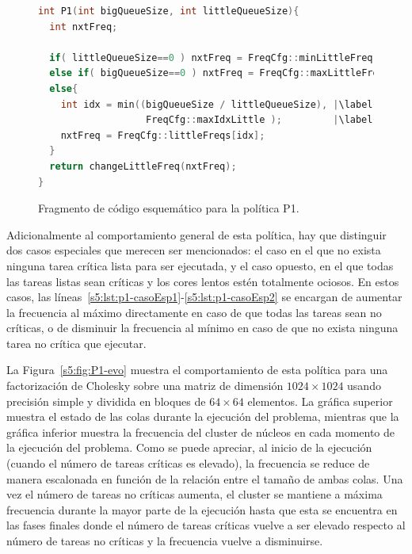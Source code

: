 \begin{figure}
  \centering

  \begin{lstlisting}[language=C++]
int P1(int bigQueueSize, int littleQueueSize){
  int nxtFreq;
      
  if( littleQueueSize==0 ) nxtFreq = FreqCfg::minLittleFreq; |\label{s5:lst:p1-casoEsp1}|
  else if( bigQueueSize==0 ) nxtFreq = FreqCfg::maxLittleFreq; |\label{s5:lst:p1-casoEsp2}|
  else{
    int idx = min((bigQueueSize / littleQueueSize), |\label{s5:lst:p1-calculoPrincipal(a)}|
                   FreqCfg::maxIdxLittle );         |\label{s5:lst:p1-calculoPrincipal(b)}|
    nxtFreq = FreqCfg::littleFreqs[idx];
  }
  return changeLittleFreq(nxtFreq);
}
\end{lstlisting}

  \caption[Fragmento de código esquemático para la política P1]
  {Fragmento de código esquemático para la política P1.}
  \label{s5:fig:listing-p1}
\end{figure}

Adicionalmente al comportamiento general de esta política, hay que
distinguir dos casos especiales que merecen ser mencionados: el caso en el
que no exista ninguna tarea crítica lista para ser ejecutada, y el caso
opuesto, en el que todas las tareas listas sean críticas y los cores lentos
estén totalmente ociosos. En estos casos, las
líneas~\ref{s5:lst:p1-casoEsp1}-\ref{s5:lst:p1-casoEsp2} se encargan de
aumentar la frecuencia al máximo directamente en caso de que todas las
tareas sean no críticas, o de disminuir la frecuencia al mínimo en caso de
que no exista ninguna tarea no crítica que ejecutar.

La Figura~\ref{s5:fig:P1-evo} muestra el comportamiento de esta política
para una factorización de Cholesky sobre una matriz de dimensión
$1024 \times 1024$ usando precisión simple y dividida en bloques de
$64 \times 64$ elementos. La gráfica superior muestra el estado de las
colas durante la ejecución del problema, mientras que la gráfica inferior
muestra la frecuencia del cluster de núcleos \LITTLE en cada momento de la
ejecución del problema. Como se puede apreciar, al inicio de la ejecución
(cuando el número de tareas críticas es elevado), la frecuencia se reduce
de manera escalonada en función de la relación entre el tamaño de ambas
colas. Una vez el número de tareas no críticas aumenta, el cluster se
mantiene a máxima frecuencia durante la mayor parte de la ejecución hasta
que esta se encuentra en las fases finales donde el número de tareas
críticas vuelve a ser elevado respecto al número de tareas no críticas y la
frecuencia vuelve a disminuirse.


